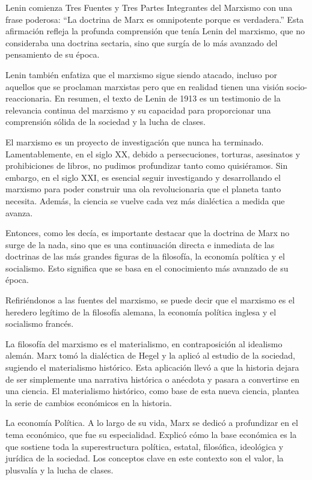 \documentclass[
  jou,
  floatsintext,
  longtable,
  a4paper,
  nolmodern,
  notxfonts,
  notimes,
  colorlinks=true,linkcolor=blue,citecolor=blue,urlcolor=blue]{apa7}
\begin{document}
Lenin comienza Tres Fuentes y Tres Partes Integrantes del Marxismo con
una frase poderosa: ``La doctrina de Marx es omnipotente porque es
verdadera.'' Esta afirmación refleja la profunda comprensión que tenía
Lenin del marxismo, que no consideraba una doctrina sectaria, sino que
surgía de lo más avanzado del pensamiento de su época.

Lenin también enfatiza que el marxismo sigue siendo atacado, incluso por
aquellos que se proclaman marxistas pero que en realidad tienen una
visión socio-reaccionaria. En resumen, el texto de Lenin de 1913 es un
testimonio de la relevancia continua del marxismo y su capacidad para
proporcionar una comprensión sólida de la sociedad y la lucha de clases.

El marxismo es un proyecto de investigación que nunca ha terminado.
Lamentablemente, en el siglo XX, debido a persecuciones, torturas,
asesinatos y prohibiciones de libros, no pudimos profundizar tanto como
quisiéramos. Sin embargo, en el siglo XXI, es esencial seguir
investigando y desarrollando el marxismo para poder construir una ola
revolucionaria que el planeta tanto necesita. Además, la ciencia se
vuelve cada vez más dialéctica a medida que avanza.

Entonces, como les decía, es importante destacar que la doctrina de Marx
no surge de la nada, sino que es una continuación directa e inmediata de
las doctrinas de las más grandes figuras de la filosofía, la economía
política y el socialismo. Esto significa que se basa en el conocimiento
más avanzado de su época.

Refiriéndonos a las fuentes del marxismo, se puede decir que el marxismo
es el heredero legítimo de la filosofía alemana, la economía política
inglesa y el socialismo francés.

La filosofía del marxismo es el materialismo, en contraposición al
idealismo alemán. Marx tomó la dialéctica de Hegel y la aplicó al
estudio de la sociedad, sugiendo el materialismo histórico. Esta
aplicación llevó a que la historia dejara de ser simplemente una
narrativa histórica o anécdota y pasara a convertirse en una ciencia. El
materialismo histórico, como base de esta nueva ciencia, plantea la
serie de cambios económicos en la historia.

La economía Política. A lo largo de su vida, Marx se dedicó a
profundizar en el tema económico, que fue su especialidad. Explicó cómo
la base económica es la que sostiene toda la superestructura política,
estatal, filosófica, ideológica y jurídica de la sociedad. Los conceptos
clave en este contexto son el valor, la plusvalía y la lucha de clases.
\end{document}
